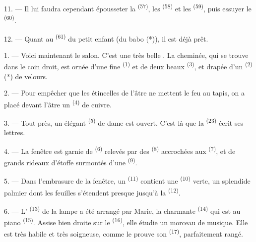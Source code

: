 11. --- Il lui faudra cependant épousseter la 
\textsuperscript{(57)}, les  \textsuperscript{(58)} et les
 \textsuperscript{(59)}, puis essuyer le 
\textsuperscript{(60)}.

12. --- Quant au  \textsuperscript{(61)} du petit enfant (du
babo (*)), il est déjà prêt.

\VUsaut{5.0mm}
\VUsaut{3.0mm}

1. --- Voici maintenant le salon. C'est une très belle . La
cheminée, qui se trouve dans le coin droit, est ornée d'une fine
 \textsuperscript{(1)} et de deux beaux 
\textsuperscript{(3)}, et drapée d'un  \textsuperscript{(2)}
(*) de velours.

2. --- Pour empêcher que les étincelles de l'âtre ne mettent le feu au tapis,
on a placé devant l'âtre un  \textsuperscript{(4)} de
cuivre.

3. --- Tout près, un élégant  \textsuperscript{(5)} de dame
est ouvert. C'est là que la  \textsuperscript{(23)}
écrit ses lettres.

4. --- La fenêtre est garnie de 
\textsuperscript{(6)} relevés par des  \textsuperscript{(8)}
accrochées aux  \textsuperscript{(7)}, et de grands rideaux
d'étoffe surmontés d'une  \textsuperscript{(9)}.

5. --- Dans l'embrasure de la fenêtre, un 
\textsuperscript{(11)} contient une  \textsuperscript{(10)}
verte, un splendide palmier dont les feuilles s'étendent presque jusqu'à la
 \textsuperscript{(12)}.

6. --- L' \textsuperscript{(13)} de la lampe a été arrangé
par Marie, la charmante  \textsuperscript{(14)} qui est au
piano \textsuperscript{(15)}. Assise bien droite sur le 
\textsuperscript{(16)}, elle étudie un morceau de musique. Elle est très habile
et très soigneuse, comme le prouve son 
\textsuperscript{(17)}, parfaitement rangé.

\VUsaut{5.0mm}
\VUsaut{3.0mm}


